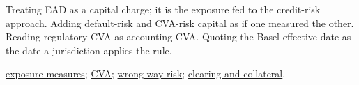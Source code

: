 \begin{qfrule}
 Treating EAD as a capital charge; it is the exposure fed to the credit-risk approach. Adding default-risk and CVA-risk capital as if one measured the other. Reading regulatory CVA as accounting CVA. Quoting the Basel effective date as the date a jurisdiction applies the rule.

 \hyperref[def:counterparty-exposure-measures]{exposure measures}; \hyperref[meth:credit-valuation-adjustment]{CVA}; \hyperref[def:wrong-way-risk]{wrong-way risk}; \hyperref[mech:otc-clearing-collateral]{clearing and collateral}.

\end{qfrule}
